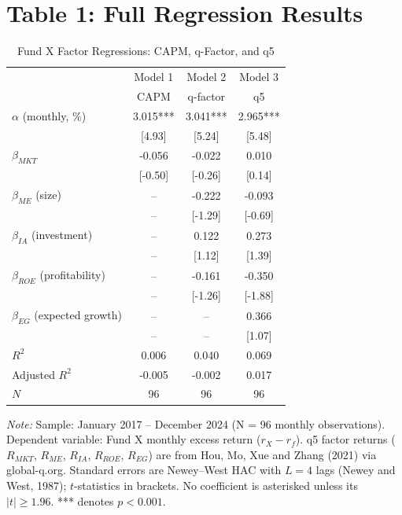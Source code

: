 \documentclass[11pt]{article}
\begin{document}
\section*{Table 1: Full Regression Results}
\begin{table}[H]
\centering
\caption{Fund X Factor Regressions: CAPM, q-Factor, and q5}
\label{tab:factor-regressions}
\small
\begin{tabular}{lccc}
\toprule
 & Model 1 & Model 2 & Model 3 \\
 & CAPM & q-factor & q5 \\
\midrule
$\alpha$ (monthly, \%) &
3.015*** & 3.041*** & 2.965*** \\
 & [4.93] & [5.24] & [5.48] \\[3pt]
$\beta_{MKT}$ &
-0.056 & -0.022 & 0.010 \\
 & [-0.50] & [-0.26] & [0.14] \\[3pt]
$\beta_{ME}$ (size) &
-- & -0.222 & -0.093 \\
 & -- & [-1.29] & [-0.69] \\[3pt]
$\beta_{IA}$ (investment) &
-- & 0.122 & 0.273 \\
 & -- & [1.12] & [1.39] \\[3pt]
$\beta_{ROE}$ (profitability) &
-- & -0.161 & -0.350 \\
 & -- & [-1.26] & [-1.88] \\[3pt]
$\beta_{EG}$ (expected growth) &
-- & -- & 0.366 \\
 & -- & -- & [1.07] \\
\midrule
$R^2$ & 0.006 & 0.040 & 0.069 \\
Adjusted $R^2$ & -0.005 & -0.002 & 0.017 \\
$N$ & 96 & 96 & 96 \\
\bottomrule
\end{tabular}

\vspace{0.2cm}
\begin{minipage}{0.96\linewidth}
\footnotesize
\textit{Note:} Sample: January 2017 -- December 2024 (N = 96 monthly observations).
Dependent variable: Fund X monthly excess return ($r_X-r_f$). q5 factor returns
($R_{MKT}$, $R_{ME}$, $R_{IA}$, $R_{ROE}$, $R_{EG}$) are from Hou, Mo,
Xue and Zhang (2021) via global-q.org. Standard errors are Newey--West HAC with
$L=4$ lags (Newey and West, 1987); $t$-statistics in brackets. No coefficient is
asterisked unless its $|t|\geq1.96$. *** denotes $p<0.001$.
\end{minipage}
\end{table}
\end{document}

